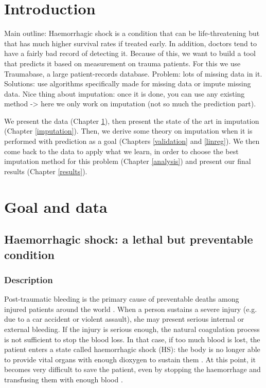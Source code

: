 \documentclass[12pt, a4paper]{memoir}
\begin{document}
\tableofcontents*
\vspace*{\fill}

\chapter*{Introduction}
Main outline: Haemorrhagic shock is a condition that can be life-threatening but that has much higher survival rates if treated early. In addition, doctors tend to have a fairly bad record of detecting it. Because of this, we want to build a tool that predicts it based on measurement on trauma patients. For this we use Traumabase, a large patient-records database. Problem: lots of missing data in it. Solutions: use algorithms specifically made for missing data or impute missing data. Nice thing about imputation: once it is done, you can use any existing method -> here we only work on imputation (not so much the prediction part).

We present the data (Chapter \ref{data}), then present the state of the art in imputation (Chapter \ref{imputation}). Then, we derive some theory on imputation when it is performed with prediction as a goal (Chapters \ref{validation} and \ref{linreg}). We then come back to the data to apply what we learn, in order to choose the best imputation method for this problem (Chapter \ref{analysis}) and present our final results (Chapter \ref{results}).

\chapter{Goal and data}
\label{data}
	\section{Haemorrhagic shock: a lethal but preventable condition}
	\label{shock}
		\subsection{Description}
Post-traumatic bleeding is the primary cause of preventable deaths among injured patients around the world \cite{WHO}\cite{urban}. When a person sustains a severe injury (e.g. due to a car accident or violent assault), she may present serious internal or external bleeding. If the injury is serious enough, the natural coagulation process is not sufficient to stop the blood loss. In that case, if too much blood is lost, the patient enters a state called haemorrhagic shock (HS): the body is no longer able to provide vital organs with enough dioxygen to sustain them \cite{HS_def}. At this point, it becomes very difficult to save the patient, even by stopping the haemorrhage and transfusing them with enough blood \cite{??}.
\end{document}
